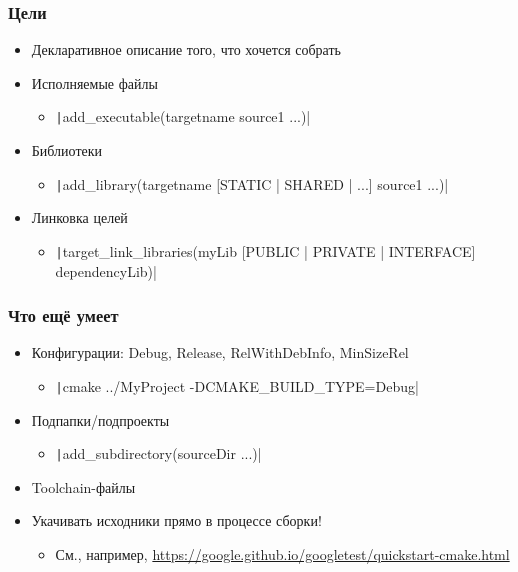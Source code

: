 \documentclass{../../slides-style}
\begin{document}
    \begin{frame}
        \frametitle{Цели}
        \begin{itemize}
            \item Декларативное описание того, что хочется собрать
            \item Исполняемые файлы
            \begin{itemize}
                \item \texttt|add_executable(targetname source1 ...)|
            \end{itemize}
            \item Библиотеки
            \begin{itemize}
                \item \texttt|add_library(targetname [STATIC | SHARED | ...] source1 ...)|
            \end{itemize}
            \item Линковка целей
            \begin{itemize}
                \item \texttt|target_link_libraries(myLib [PUBLIC | PRIVATE | INTERFACE] dependencyLib)|
            \end{itemize}
        \end{itemize}
    \end{frame}

    \begin{frame}
        \frametitle{Что ещё умеет}
        \begin{itemize}
            \item Конфигурации: Debug, Release, RelWithDebInfo, MinSizeRel
            \begin{itemize}
                \item \texttt|cmake ../MyProject -DCMAKE_BUILD_TYPE=Debug|
            \end{itemize}
            \item Подпапки/подпроекты
            \begin{itemize}
                \item \texttt|add_subdirectory(sourceDir ...)|
            \end{itemize}
            \item Toolchain-файлы
            \item Укачивать исходники прямо в процессе сборки!
            \begin{itemize}
                \item См., например, \url{https://google.github.io/googletest/quickstart-cmake.html}
            \end{itemize}
        \end{itemize}
    \end{frame}
\end{document}
